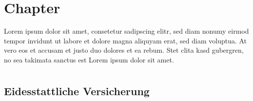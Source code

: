 \documentclass[
	12pt,
	a4paper,
	BCOR10mm,
	DIV14,
	headsepline,
]{scrreprt}
\begin{document}
%
%
%
%
%
%
%




\appendix
\appendixpage

\chapter{Chapter}

Lorem ipsum dolor sit amet, consetetur sadipscing elitr, sed diam nonumy eirmod tempor invidunt ut labore et dolore magna aliquyam erat, sed diam voluptua.
At vero eos et accusam et justo duo dolores et ea rebum.
Stet clita kasd gubergren, no sea takimata sanctus est Lorem ipsum dolor sit amet.

\listoffigures

\lstlistoflistings

\listoftables

\chapter*{}

\thispagestyle{empty}

\section*{Eidesstattliche Versicherung}
\end{document}
